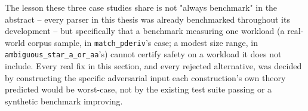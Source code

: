The lesson these three case studies share is not "always benchmark" in
the abstract -- every parser in this thesis was already benchmarked
throughout its development -- but specifically that a benchmark
measuring one workload (a real-world corpus sample, in
\texttt{match\_pderiv}'s case; a modest size range, in
\texttt{ambiguous\_star\_a\_or\_aa}'s) cannot certify safety on a
workload it does not include. Every real fix in this section, and every
rejected alternative, was decided by constructing the specific
adversarial input each construction's own theory predicted would be
worst-case, not by the existing test suite passing or a synthetic
benchmark improving.
